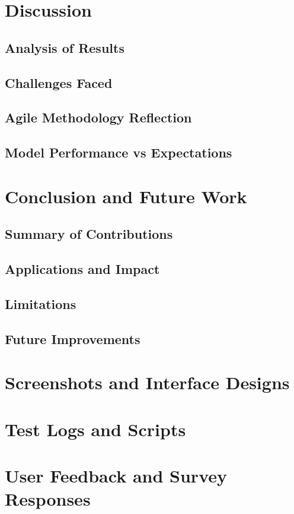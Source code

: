\documentclass{report}
\begin{document}
\chapter{Discussion}  %
\section{Analysis of Results}
\section{Challenges Faced}
\section{Agile Methodology Reflection}
\section{Model Performance vs Expectations}

\chapter{Conclusion and Future Work}  %
\section{Summary of Contributions}
\section{Applications and Impact}
\section{Limitations}
\section{Future Improvements}


\printbibliography%

\appendix
\chapter{Screenshots and Interface Designs}
\chapter{Test Logs and Scripts}
\chapter{User Feedback and Survey Responses}
\end{document}
